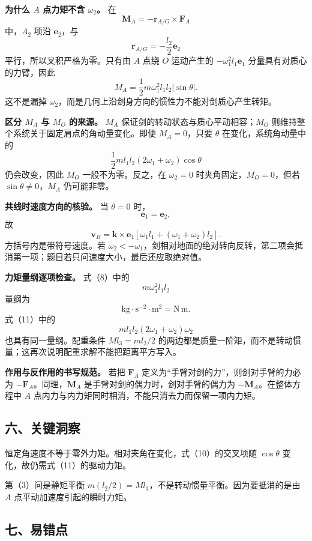 \documentclass[12pt,a4paper,UTF8]{ctexart}
\begin{document}
\textbf{为什么 \(A\) 点力矩不含 \(\omega_2\)。} 在 \[
\boldsymbol M_A
=-\boldsymbol r_{A/G}\times\boldsymbol F_A
\] 中，\(A_2\) 项沿 \(\boldsymbol e_2\)，与 \[
\boldsymbol r_{A/G}=-\frac{l_2}{2}\boldsymbol e_2
\] 平行，所以叉积严格为零。只有由 \(A\) 点绕 \(O\) 运动产生的
\(-\omega_1^2l_1\boldsymbol e_1\) 分量具有对质心的力臂，因此 \[
M_A=\frac12m\omega_1^2l_1l_2|\sin\theta|.
\] 这不是漏掉
\(\omega_2\)，而是几何上沿剑身方向的惯性力不能对剑质心产生转矩。

\textbf{区分 \(M_A\) 与 \(M_O\) 的来源。} \(M_A\)
保证剑的转动状态与质心平动相容；\(M_O\)
则维持整个系统关于固定肩点的角动量变化。即便 \(M_A=0\)，只要 \(\theta\)
在变化，系统角动量中的 \[
\frac12ml_1l_2(2\omega_1+\omega_2)\cos\theta
\] 仍会改变，因此 \(M_O\) 一般不为零。反之，在 \(\omega_2=0\)
时夹角固定，\(M_O=0\)，但若 \(\sin\theta\ne0\)，\(M_A\) 仍可能非零。

\textbf{共线时速度方向的核验。} 当 \(\theta=0\) 时， \[
\boldsymbol e_1=\boldsymbol e_2,
\] 故 \[
\boldsymbol v_B
=\boldsymbol k\times\boldsymbol e_1
\left[
\omega_1l_1+(\omega_1+\omega_2)l_2
\right].
\] 方括号内是带符号速度。若
\(\omega_2<-\omega_1\)，剑相对地面的绝对转向反转，第二项会抵消第一项；题目若只问速度大小，最后还应取绝对值。

\textbf{力矩量纲逐项检查。} 式（8）中的 \[
m\omega_1^2l_1l_2
\] 量纲为 \[
\mathrm{kg}\cdot\mathrm{s^{-2}}\cdot\mathrm m^2
=\mathrm{N\,m}.
\] 式（11）中的 \[
ml_1l_2(2\omega_1+\omega_2)\omega_2
\] 也具有同一量纲。配重条件 \(Ml_3=ml_2/2\)
的两边都是质量一阶矩，而不是转动惯量；这再次说明配重求解不能把距离平方写入。

\textbf{作用与反作用的书写规范。} 若把 \(\boldsymbol F_A\)
定义为``手臂对剑的力''，则剑对手臂的力必为
\(-\boldsymbol F_A\)。同理，\(\boldsymbol M_A\)
是手臂对剑的偶力时，剑对手臂的偶力为 \(-\boldsymbol M_A\)。在整体方程中
\(A\) 点内力与内力矩同时相消，不能只消去力而保留一项内力矩。

\subsection{六、关键洞察}\label{ux516dux5173ux952eux6d1eux5bdf-3}

恒定角速度不等于零外力矩。相对夹角在变化，式（10）的交叉项随
\(\cos\theta\) 变化，故仍需式（11）的驱动力矩。

第（3）问是静矩平衡
\(m(l_2/2)=Ml_3\)，不是转动惯量平衡。因为要抵消的是由 \(A\)
点平动加速度引起的瞬时力矩。

\subsection{七、易错点}\label{ux4e03ux6613ux9519ux70b9-3}
\end{document}
